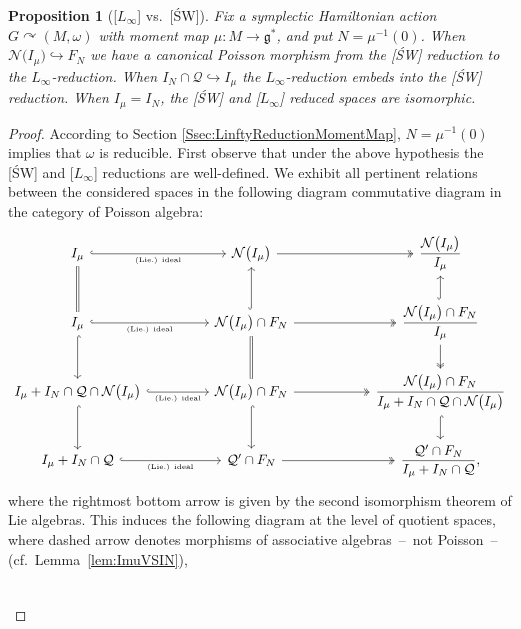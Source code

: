 \documentclass[10pt,a4paper]{amsart}
\numberwithin{equation}{section}
\newtheorem{Proposition}[Theorem]{Proposition}
 { \theoremstyle{definition}
\newtheorem{Definition}[Theorem]{Definition}
\newtheorem{Note}[Theorem]{Note}
\newtheorem{Example}[Theorem]{Example}
\newtheorem{Remark}[Theorem]{Remark} }
\DeclareMathOperator{\action}{\curvearrowright}
\newcommand{\g}{\mathfrak{g}}
\begin{document}
\begin{Proposition}[{[$L_\infty$] vs.\ [\'SW]}]\label{prop:LinftyVsSW}
	Fix a symplectic Hamiltonian action $G\action (M,\omega)$ with moment map $\mu\colon M\to\g^*$, and put $N=\mu^{-1}(0)$.
	When $\mathcal{N}\bigl(I_\mu\bigr)\hookrightarrow F_N$ we have a canonical Poisson morphism from the {\rm [\'SW]} reduction to the $L_\infty$-reduction.
	When $I_N\cap\mathcal{Q}\hookrightarrow I_\mu$ the $L_\infty$-reduction embeds into the {\rm [\'SW]} reduction.
	When $I_\mu=I_N$, the {\rm [\'SW]} and {\rm [$L_\infty$]} reduced spaces are isomorphic.
\end{Proposition}
\begin{proof}
	According to Section \ref{Ssec:LinftyReductionMomentMap}, $N=\mu^{-1}(0)$ implies that $\omega$ is reducible.
	First observe that under the above hypothesis the [\'SW] and [$L_\infty$] reductions are well-defined.
	We exhibit all pertinent relations between the considered spaces in the following diagram commutative diagram in the category of Poisson algebra:
	\[
		\begin{tikzcd}[column sep = large]
			I_{\mu} \ar[r,hook,"\text{\tiny (Lie.) ideal}"'] \ar[d,equal] &[1em]
			\mathcal{N}\bigl(I_\mu\bigr)\ar[r,two heads] &[2em]
			\dfrac{\mathcal{N}\bigl(I_\mu\bigr)}{I_\mu}
			\\
			I_{\mu} \ar[d,hook]\ar[r,hook,"\text{\tiny (Lie.) ideal}"'] &
			\mathcal{N}\bigl(I_\mu\bigr)\cap F_N \ar[u,hook]\ar[d,equal]\ar[r,two heads]&
			\dfrac{\mathcal{N}\bigl(I_\mu\bigr)\cap F_N}{I_{\mu}}		\ar[u,hook]\ar[d,two heads]
			\\
			I_{\mu} + I_N\cap \mathcal{Q}\cap \mathcal{N}\bigl(I_\mu\bigr) \ar[d,hook]\ar[r,hook,"\text{\tiny (Lie.) ideal}"'] &
			\mathcal{N}\bigl(I_\mu\bigr)\cap F_N \ar[d,hook]\ar[r,two heads]&
			\dfrac{\mathcal{N}\bigl(I_\mu\bigr)\cap F_N}{I_{\mu} + I_N\cap \mathcal{Q}\cap \mathcal{N}\bigl(I_\mu\bigr)}		\ar[d,hook]
			\\
			I_\mu+ I_N\cap\mathcal{Q} \ar[r,hook,"\text{\tiny (Lie.) ideal}"'] &
			\mathcal{Q}'\cap F_N \ar[r,two heads]&
			\dfrac{\mathcal{Q}'\cap F_N}{I_\mu+ I_N\cap\mathcal{Q}},
		\end{tikzcd}
	\]
	where the rightmost bottom arrow is given by the second isomorphism theorem of Lie algebras.
	This induces the following diagram at the level of quotient spaces, where dashed arrow denotes morphisms of associative algebras~--~not Poisson~-- (cf.\ Lemma~\ref{lem:ImuVSIN}),
	\[
		\begin{tikzcd}[column sep = large,
			cells={font=\everymath\expandafter{\the\everymath\displaystyle}},]

\end{tikzcd}\]
\end{proof}
\end{document}
